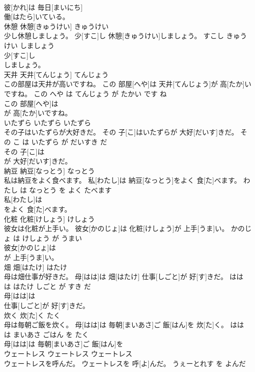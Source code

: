 \documentclass[8pt]{extreport}
\begin{document}
\begin{CJK}{UTF8}{min}
\\	彼[かれ]は 毎日[まいにち]
\\	働[はたら]いている。		
\\	休憩	休憩[きゅうけい]	きゅうけい	
\\	少し休憩しましょう。	少[すこ]し 休憩[きゅうけい]しましょう。	すこし きゅうけい しましょう	
\\	少[すこ]し
\\	しましょう。		
\\	天井	天井[てんじょう]	てんじょう	
\\	この部屋は天井が高いですね。	この 部屋[へや]は 天井[てんじょう]が 高[たか]いですね。	この へや は てんじょう が たかい です ね	
\\	この 部屋[へや]は
\\	が 高[たか]いですね。		
\\	いたずら	いたずら	いたずら	
\\	その子はいたずらが大好きだ。	その 子[こ]はいたずらが 大好[だいす]きだ。	その こ は いたずら が だいすき だ	
\\	その 子[こ]は
\\	が 大好[だいす]きだ。		
\\	納豆	納豆[なっとう]	なっとう	
\\	私は納豆をよく食べます。	私[わたし]は 納豆[なっとう]をよく 食[た]べます。	わたし は なっとう を よく たべます	
\\	私[わたし]は
\\	をよく 食[た]べます。		
\\	化粧	化粧[けしょう]	けしょう	
\\	彼女は化粧が上手い。	彼女[かのじょ]は 化粧[けしょう]が 上手[うま]い。	かのじょ は けしょう が うまい	
\\	彼女[かのじょ]は
\\	が 上手[うま]い。		
\\	畑	畑[はたけ]	はたけ	
\\	母は畑仕事が好きだ。	母[はは]は 畑[はたけ] 仕事[しごと]が 好[す]きだ。	はは は はたけ しごと が すき だ	
\\	母[はは]は
\\	仕事[しごと]が 好[す]きだ。		
\\	炊く	炊[た]く	たく	
\\	母は毎朝ご飯を炊く。	母[はは]は 毎朝[まいあさ]ご 飯[はん]を 炊[た]く。	はは は まいあさ ごはん を たく	
\\	母[はは]は 毎朝[まいあさ]ご 飯[はん]を
\\	ウェートレス	ウェートレス	ウェートレス	
\\	ウェートレスを呼んだ。	ウェートレスを 呼[よ]んだ。	うぇーとれす を よんだ	

\end{CJK}
\end{document}

